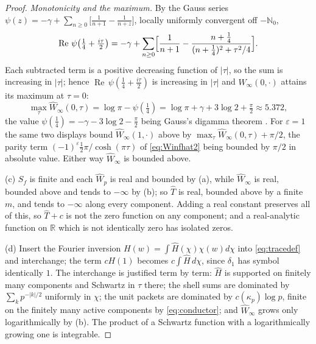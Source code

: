 \documentclass[11pt]{amsart}
\theoremstyle{definition}
\theoremstyle{remark}
\newcommand{\R}{\mathbb R}
\newcommand{\N}{\mathbb N}
\newcommand{\Rel}{\operatorname{Re}}
\newcommand{\Th}{\widehat{T}}
\newcommand{\Wh}{\widehat{W}}
\begin{document}
\begin{proof}
\emph{Monotonicity and the maximum.}  By the Gauss series
$\psi(z)=-\gamma+\sum_{n\ge0}\bigl[\tfrac1{n+1}-\tfrac1{n+z}\bigr]$, locally
uniformly convergent off $-\N_0$,
\[
\Rel\,\psi\bigl(\tfrac14+\tfrac{i\tau}{2}\bigr)
=-\gamma+\sum_{n\ge0}\Bigl[\frac1{n+1}
-\frac{n+\tfrac14}{(n+\tfrac14)^{2}+\tau^{2}/4}\Bigr].
\]
Each subtracted term is a positive decreasing function of $|\tau|$, so the sum
is increasing in $|\tau|$; hence $\Rel\,\psi(\tfrac14+\tfrac{i\tau}{2})$ is
increasing in $|\tau|$ and $\Wh_{\infty}(0,\cdot)$ attains its maximum at
$\tau=0$:
\begin{equation}\label{eq:maxarch}
\max_{\tau}\Wh_{\infty}(0,\tau)=\log\pi-\psi(\tfrac14)
=\log\pi+\gamma+3\log2+\tfrac{\pi}{2}\approx5.372 ,
\end{equation}
the value $\psi(\tfrac14)=-\gamma-3\log2-\tfrac{\pi}{2}$ being Gauss's digamma
theorem \cite[\S5.4(iii)]{DLMF}.  For $\varepsilon=1$ the same two displays
bound $\Wh_{\infty}(1,\cdot)$ above by $\max_{\tau}\Wh_{\infty}(0,\tau)+\pi/2$,
the parity term $(-1)^{\varepsilon}\tfrac12\pi/\cosh(\pi\tau)$ of
\eqref{eq:Winfhat2} being bounded by $\pi/2$ in absolute value.
Either way $\Wh_{\infty}$ is bounded above.

(c)  $S_f$ is finite and each $\Wh_p$ is real and bounded by (a), while
$\Wh_{\infty}$ is real, bounded above and tends to $-\infty$ by (b); so $\Th$
is real, bounded above by a finite $m$, and tends to $-\infty$ along every
component.  Adding a real constant preserves all of this, so $\Th+c$ is not the
zero function on any component; and a real-analytic function on $\R$ which is
not identically zero has isolated zeros.

(d)  Insert the Fourier inversion $H(w)=\int\widehat H(\chi)\chi(w)d\chi$ into
\eqref{eq:tracedef} and interchange; the term $cH(1)$ becomes
$c\int\widehat H\,d\chi$, since $\delta_1$ has symbol identically $1$.  The
interchange is justified term by term: $\widehat H$ is supported on finitely many
components and Schwartz in $\tau$ there; the shell sums are dominated by
$\sum_kp^{-|k|/2}$ uniformly in $\chi$; the unit packets are dominated by
$c(\kappa_p)\log p$, finite on the finitely many active components by
\eqref{eq:conductor}; and $\Wh_{\infty}$ grows only logarithmically by (b).
The product of a Schwartz function with a logarithmically growing one is
integrable.
\end{proof}
\end{document}
